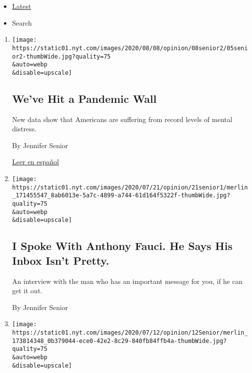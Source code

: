 \begin{itemize}
\tightlist
\item
  \protect\hyperlink{stream-panel}{Latest}
\item
  Search
\end{itemize}

\begin{enumerate}
\def\labelenumi{\arabic{enumi}.}
\item
  \href{/2020/08/05/opinion/coronavirus-mental-illness-depression.html}{}

  \texttt{[image: https://static01.nyt.com/images/2020/08/08/opinion/08senior2/05senior2-thumbWide.jpg?quality=75\\\&auto=webp\\\&disable=upscale]}

  \hypertarget{weve-hit-a-pandemic-wall}{%
  \subsection{We've Hit a Pandemic
  Wall}\label{weve-hit-a-pandemic-wall}}

  New data show that Americans are suffering from record levels of
  mental distress.

  By Jennifer Senior

  \href{https://www.nytimes.com/es/2020/08/07/espanol/opinion/ansiedad-coronavirus.html}{Leer
  en español}
\item
  \href{/2020/07/21/opinion/anthony-fauci-coronavirus.html}{}

  \texttt{[image: https://static01.nyt.com/images/2020/07/21/opinion/21senior1/merlin\_171455547\_8ab6013e-5a7c-4899-a744-61d164f5322f-thumbWide.jpg?quality=75\\\&auto=webp\\\&disable=upscale]}

  \hypertarget{i-spoke-with-anthony-fauci-he-says-his-inbox-isnt-pretty}{%
  \subsection{I Spoke With Anthony Fauci. He Says His Inbox Isn't
  Pretty.}\label{i-spoke-with-anthony-fauci-he-says-his-inbox-isnt-pretty}}

  An interview with the man who has an important message for you, if he
  can get it out.

  By Jennifer Senior
\item
  \href{/2020/07/12/opinion/liberal-arts-college-covid.html}{}

  \texttt{[image: https://static01.nyt.com/images/2020/07/12/opinion/12Senior/merlin\_173814348\_0b379044-ece0-42e2-8c29-840fb84ffb4a-thumbWide.jpg?quality=75\\\&auto=webp\\\&disable=upscale]}


\end{enumerate}

